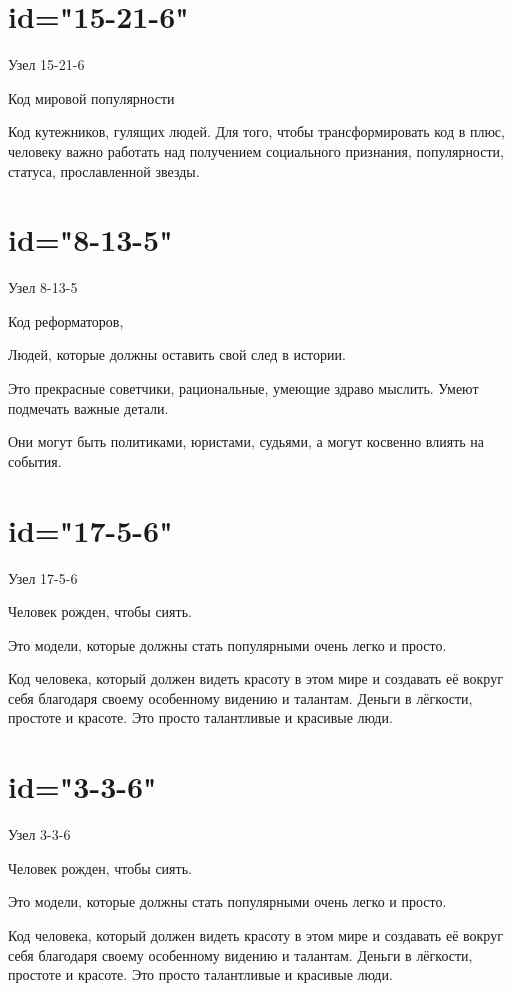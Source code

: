 \section{id="15-21-6"}{Узел 15-21-6}
\item Код мировой популярности
\item Код кутежников, гулящих людей. Для того, чтобы 
трансформировать код в плюс, человеку важно работать над 
получением социального признания, популярности, статуса, 
прославленной звезды.
\endsection

\section{id="8-13-5"}{Узел 8-13-5}
\item Код реформаторов,
\item Людей, которые должны оставить свой след в истории.
\item Это прекрасные советчики, рациональные, умеющие здраво 
мыслить. Умеют подмечать важные детали.
\item Они могут быть политиками, юристами, судьями, а могут 
косвенно влиять на события.
\endsection

\section{id="17-5-6"}{Узел 17-5-6}
\item Человек рожден, чтобы сиять.
\item Это модели, которые должны стать популярными очень легко 
и просто.
\item Код человека, который должен видеть красоту в этом мире 
и создавать её вокруг себя благодаря своему особенному видению 
и талантам. Деньги в лёгкости, простоте и красоте. Это просто 
талантливые и красивые люди.
\endsection

\section{id="3-3-6"}{Узел 3-3-6}
\item Человек рожден, чтобы сиять.
\item Это модели, которые должны стать популярными очень легко 
и просто.
\item Код человека, который должен видеть красоту в этом мире 
и создавать её вокруг себя благодаря своему особенному видению 
и талантам. Деньги в лёгкости, простоте и красоте. Это просто 
талантливые и красивые люди.
\endsection

